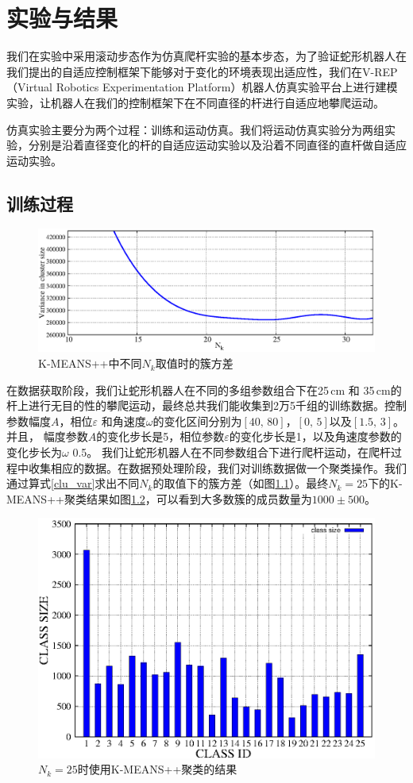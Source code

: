 \chapter{实验与结果}
\label{cha:experiment}
我们在实验中采用滚动步态作为仿真爬杆实验的基本步态，为了验证蛇形机器人在我们提出的自适应控制框架下能够对于变化的环境表现出适应性，我们在V-REP（Virtual Robotics Experimentation Platform）机器人仿真实验平台上进行建模实验，让机器人在我们的控制框架下在不同直径的杆进行自适应地攀爬运动。

仿真实验主要分为两个过程：训练和运动仿真。我们将运动仿真实验分为两组实验，分别是沿着直径变化的杆的自适应运动实验以及沿着不同直径的直杆做自适应运动实验。
\section{训练过程}
\begin{figure}[!h]
	\centering
	\includegraphics[width=0.9\linewidth,height=0.35\textheight]{figure/chap05/clusize.eps}
	\caption{K-MEANS++中不同$N_{k}$取值时的簇方差}
	\label{fig:clusize}
\end{figure}
在数据获取阶段，我们让蛇形机器人在不同的多组参数组合下在25\,cm 和 35\,cm的杆上进行无目的性的攀爬运动，最终总共我们能收集到2万5千组的训练数据。控制参数幅度$A$，相位$\varepsilon$ 和角速度$\omega$的变化区间分别为$[40, \, 80]$，$[0, \, 5]$以及$[1.5, \, 3]$。并且， 幅度参数$A$的变化步长是5，相位参数$\varepsilon$的变化步长是1，以及角速度参数的变化步长为$\omega$ 0.5。 我们让蛇形机器人在不同参数组合下进行爬杆运动，在爬杆过程中收集相应的数据。在数据预处理阶段，我们对训练数据做一个聚类操作。我们通过算式\ref{clu_var}求出不同$N_{k}$的取值下的簇方差（如图\ref{fig:clusize}）。最终$N_{k}=25$下的K-MEANS++聚类结果如图\ref{fig:clustersize}，可以看到大多数簇的成员数量为$1000 \pm 500 $。

\begin{figure}[t]
	\centering
	\includegraphics[width=0.6\linewidth]{figure/chap05/cluster.eps}
	\caption{$N_{k}=25$时使用K-MEANS++聚类的结果}
	\label{fig:clustersize}
\end{figure}

